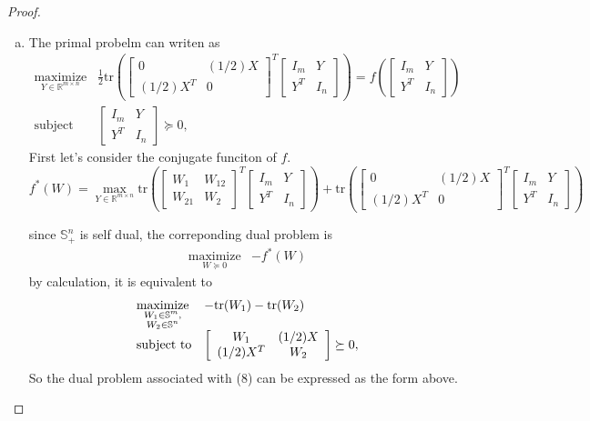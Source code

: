 \documentclass{article}
\theoremstyle{remark}
\theoremstyle{definition}
\newcommand{\maximize}{\mathop{\mathrm{maximize}}}
\newcommand{\maximizewrt}[1]{\underset{#1}{\maximize}}
\newcommand{\subjectto}{\mbox{subject to}}
\def\tr{\mathrm{tr}}
\begin{document}
\begin{proof}
\begin{enumerate}[(a)]
\item The primal probelm can writen as 
     \begin{equation*}
\begin{array}{ll}
\maximizewrt{Y \in \mathbb{R}^{m \times n}} & \frac{1}{2}\tr( \begin{bmatrix}
0 &　(1/2)X\\
(1/2)X^T & 0
\end{bmatrix}^T \left[
\begin{array}{cc}
I_m & Y \\
Y^T & I_n
\end{array}
\right] ) = f(\left[
\begin{array}{cc}
I_m & Y \\
Y^T & I_n
\end{array}
\right]) \\
\subjectto & 
\left[
\begin{array}{cc}
I_m & Y \\
Y^T & I_n
\end{array}
\right]
\succeq 0,
\end{array}
\label{eq:aa:primal}
\end{equation*}
First let's consider the conjugate funciton of $f$. 
 \[f^*(W)= \max_{Y\in \mathbb{R}^{m \times n}}\tr(\left [
 \begin{array}{cc}
 W_1 & W_{12}\\
 W_{21} & W_{2} \end{array}\right]^T \left[
\begin{array}{cc}
I_m & Y \\
Y^T & I_n
\end{array}
\right]) + \tr( \begin{bmatrix}
0 &　(1/2)X\\
(1/2)X^T & 0
\end{bmatrix}^T \left[
\begin{array}{cc}
I_m & Y \\
Y^T & I_n
\end{array}
\right] )\]

since $\mathbb{S}^n_+$ is self dual, the correponding dual problem is
\begin{equation*}
    \begin{array}{cc}
    \maximizewrt{W\succeq 0} & -f^*(W)
    \end{array}
\end{equation*}
by calculation, it is equivalent to 
\begin{equation*}
\begin{array}{ll}
\maximizewrt{\substack{W_{1} \in \symm^{m}, \\ W_{2} \in \symm^{n}}} & -\tr(W_{1}) - \tr(W_{2}) \\
\subjectto & 
\left[
\begin{array}{cc}
W_{1} & (1/2) X \\
(1/2) X^T & W_{2}
\end{array}
\right]
\succeq 0,
\end{array}
\label{eq:aa:dual}
\end{equation*}
So the dual problem associated with (8) can be expressed as the form above.


\end{enumerate}
\end{proof}
\end{document}
